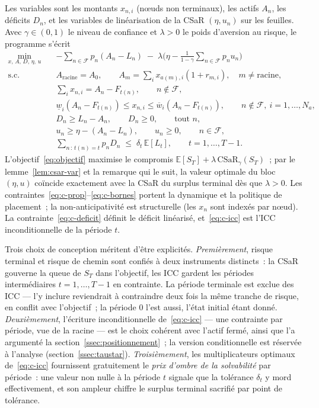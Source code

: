 \documentclass[11pt,letterpaper]{article}
\newcommand{\E}{\mathbb{E}}
\newcommand{\CSaR}{\mathrm{CSaR}}
\theoremstyle{definition}
\begin{document}
Les variables sont les montants $x_{n,i}$ (n\oe uds non terminaux), les actifs
$A_n$, les déficits $D_n$, et les variables de linéarisation de la CSaR
$(\eta, u_n)$ sur les feuilles. Avec $\gamma \in (0,1)$ le niveau de confiance et
$\lambda > 0$ le poids d'aversion au risque, le programme s'écrit
\begin{align}
\min_{x,\,A,\,D,\,\eta,\,u}\quad
& -\sum_{n \in \mathcal F} p_n (A_n - L_n)
\;-\; \lambda \Big( \eta - \tfrac{1}{1-\gamma}
      \sum_{n \in \mathcal F} p_n u_n \Big)
\label{eq:objectif}\\[2pt]
\text{s.c.}\quad
& A_{\text{racine}} = A_0, \qquad
A_m = \textstyle\sum_i x_{a(m),i} (1 + r_{m,i}), \quad m \ne \text{racine},
\label{eq:c-prop}\\
& \textstyle\sum_i x_{n,i} = A_n - F_{t(n)}, \qquad n \notin \mathcal F,
\label{eq:c-budget}\\
& \underline w_i (A_n - F_{t(n)}) \le x_{n,i} \le \overline w_i (A_n - F_{t(n)}),
\qquad n \notin \mathcal F,\ i = 1,\dots,N_a,
\label{eq:c-bornes}\\
& D_n \ge L_n - A_n, \qquad D_n \ge 0, \qquad \text{tout } n,
\label{eq:c-deficit}\\
& u_n \ge \eta - (A_n - L_n), \qquad u_n \ge 0, \qquad n \in \mathcal F,
\label{eq:c-u}\\
& \sum_{n\,:\,t(n) = t} p_n D_n \;\le\; \delta_t\, \E[L_t],
\qquad t = 1, \dots, T-1.
\label{eq:c-icc}
\end{align}
L'objectif~\eqref{eq:objectif} maximise le compromis
$\E[S_T] + \lambda\,\CSaR_\gamma(S_T)$~; par le
lemme~\ref{lem:csar-var} et la remarque qui le suit, la valeur optimale du bloc
$(\eta, u)$ coïncide exactement avec la CSaR du surplus terminal dès que
$\lambda > 0$. Les contraintes~\eqref{eq:c-prop}--\eqref{eq:c-bornes} portent la
dynamique et la politique de placement~; la non-anticipativité est structurelle
(les $x_n$ sont indexés par n\oe ud). La contrainte~\eqref{eq:c-deficit} définit le
déficit linéarisé, et~\eqref{eq:c-icc} est l'ICC inconditionnelle de la période $t$.

Trois choix de conception méritent d'être explicités. \emph{Premièrement}, risque
terminal et risque de chemin sont confiés à deux instruments distincts~: la CSaR
gouverne la queue de $S_T$ dans l'objectif, les ICC gardent les périodes
intermédiaires $t = 1, \dots, T-1$ en contrainte. La période terminale est exclue
des ICC --- l'y inclure reviendrait à contraindre deux fois la même tranche de
risque, en conflit avec l'objectif~; la période $0$ l'est aussi, l'état initial
étant donné. \emph{Deuxièmement}, l'écriture inconditionnelle
de~\eqref{eq:c-icc} --- une contrainte par période, vue de la racine --- est le
choix cohérent avec l'actif fermé, ainsi que l'a argumenté la
section~\ref{ssec:positionnement}~; la version conditionnelle est réservée à
l'analyse (section~\ref{ssec:taustar}). \emph{Troisièmement}, les multiplicateurs
optimaux de~\eqref{eq:c-icc} fournissent gratuitement le \emph{prix d'ombre de la
solvabilité} par période~: une valeur non nulle à la période $t$ signale que la
tolérance $\delta_t$ y mord effectivement, et son ampleur chiffre le surplus
terminal sacrifié par point de tolérance.
\end{document}
